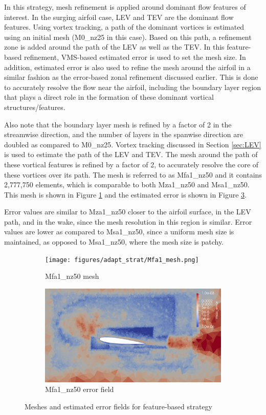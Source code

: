 In this strategy, mesh refinement is applied around dominant flow features of interest. 
In the surging airfoil case, LEV and TEV are the dominant flow features. 
Using vortex tracking, a path of the dominant vortices is estimated using an initial mesh (M0\_nz25 in this case). 
Based on this path, a refinement zone is added around the path of the LEV as well as the TEV. 
In this feature-based refinement, VMS-based estimated error is used to set the mesh size. 
In addition, estimated error is also used to refine the mesh around the airfoil in a similar fashion as the error-based zonal refinement discussed earlier. 
This is done to accurately resolve the flow near the airfoil, including the boundary layer region that plays a direct role in the formation of these dominant vortical structures/features.

Also note that the boundary layer mesh is refined by a factor of 2 in the streamwise direction, and the number of layers in the spanwise direction are doubled as compared to M0\_nz25.  
Vortex tracking discussed in Section \ref{sec:LEV} is used to estimate the path of the LEV and TEV. 
The mesh around the path of these vortical features is refined by a factor of 2, to accurately resolve the core of these vortices over its path. 
The mesh is referred to as Mfa1\_nz50 and it contains 2,777,750 elements, which is comparable to both Mza1\_nz50 and Msa1\_nz50.
This mesh is shown in Figure \ref{fig:FB_mesh} and the estimated error is shown in Figure \ref{fig:FB_error_plot}.

Error values are similar to Mza1\_nz50 closer to the airfoil surface, in the LEV path, and in the wake, since the mesh resolution in this region is similar.
Error values are lower as compared to Msa1\_nz50, since a uniform mesh size is maintained, as opposed to Msa1\_nz50, where the mesh size is patchy.


\begin{figure}[H]
\centering

\begin{subfigure}[b]{0.475\textwidth}
\centering
\texttt{[image: figures/adapt\_strat/Mfa1\_mesh.png]}
\caption{Mfa1\_nz50 mesh}
\label{fig:FB_mesh}
\end{subfigure}
\begin{subfigure}[b]{0.475\textwidth}
\centering
\includegraphics[width=1\textwidth]{figures/adapt_strat/Mfa1_error.png}
\caption{Mfa1\_nz50 error field}
\label{fig:FB_error_plot}
\end{subfigure}

\caption{Meshes and estimated error fields for feature-based strategy}
\end{figure}